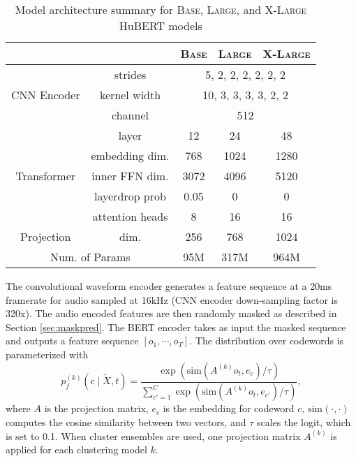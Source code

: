\begin{table}[ht]
    \centering
    \begin{tabular}{cc|ccc}
        \toprule
         & & \textsc{Base} & \textsc{Large} & \textsc{X-Large} \\
        \midrule
        \multirow{3}{*}{CNN Encoder}
        & strides      & \multicolumn{3}{c}{5, 2, 2, 2, 2, 2, 2} \\
        & kernel width & \multicolumn{3}{c}{10, 3, 3, 3, 3, 2, 2} \\
        & channel      & \multicolumn{3}{c}{512} \\
        \midrule
        \multirow{5}{*}{Transformer} 
        & layer        & 12 & 24 & 48 \\
        & embedding dim. & 768 & 1024 & 1280 \\
        & inner FFN dim. & 3072 & 4096 & 5120 \\
        & layerdrop prob  & 0.05 & 0 & 0 \\
        & attention heads & 8 & 16 & 16 \\
        \midrule
        \multirow{1}{*}{Projection} & dim. & 256 & 768 & 1024 \\
        \midrule
        \multicolumn{2}{c|}{Num. of Params} & 95M & 317M & 964M \\
        \bottomrule
        
    \end{tabular}
    \caption{Model architecture summary for \textsc{Base}, \textsc{Large}, and \textsc{X-Large} HuBERT models}
    \label{tab:arch}
\end{table}

The convolutional waveform encoder generates a feature sequence at a 20ms framerate for audio sampled at 16kHz (CNN encoder down-sampling factor is 320x). The audio encoded features are then randomly masked as described in Section \ref{sec:maskpred}. The BERT encoder takes as input the masked sequence and outputs a feature sequence $[o_1, \cdots, o_T]$. The distribution over codewords is parameterized with
\begin{equation}
    p_f^{(k)}(c \mid \tilde{X}, t) = \frac{\exp(\text{sim}(A^{(k)} o_t, e_c) / \tau)} {\sum_{c'=1}^C \exp(\text{sim}(A^{(k)} o_t, e_{c'}) / \tau)},
\end{equation}
where $A$ is the projection matrix, $e_c$ is the embedding for codeword $c$, $\text{sim}(\cdot, \cdot)$ computes the cosine similarity between two vectors, and $\tau$ scales the logit, which is set to 0.1. When cluster ensembles are used, one projection matrix $A^{(k)}$ is applied for each clustering model $k$.


